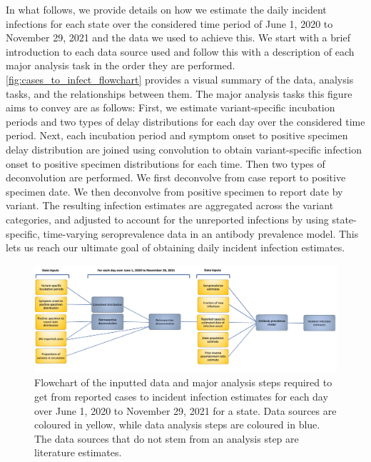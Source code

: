\documentclass{article}
\begin{document}
In what follows, we provide details on how we estimate the daily incident
infections for each state over the considered time period of June 1, 2020 to
November 29, 2021 and the data we used to achieve this. We start with a brief
introduction to each data source used and follow this with a description of each
major analysis task in the order they are performed.
\autoref{fig:cases_to_infect_flowchart} provides a visual summary of the data,
analysis tasks, and the relationships between them. The major analysis tasks this 
figure aims to convey are as follows: 
First, we estimate variant-specific incubation periods and two types of delay distributions
 for each day over the considered time period. Next, each incubation period and symptom
  onset to positive specimen delay distribution are joined using convolution to obtain
   variant-specific infection onset to positive specimen distributions for each time. Then
    two types of deconvolution are performed. We first deconvolve from case report to
     positive specimen date. We then deconvolve from positive specimen to report
      date by variant. The resulting infection estimates are aggregated across the variant
       categories, and adjusted to account for the unreported infections by using state-specific, 
       time-varying seroprevalence data in an antibody prevalence model. This lets us reach our 
       ultimate goal of obtaining daily incident infection estimates.


\begin{figure}[!tb]
\centering
    \includegraphics[width=.99\textwidth]{Reported_cases_to_infect_flowchart.pdf} 
    \caption{Flowchart of the inputted data and major analysis steps required 
    to get from reported cases to incident infection estimates for each day 
    over June 1, 2020 to November 29, 2021 for a state. Data sources are coloured 
    in yellow, while data analysis steps are coloured in blue. The data sources that
    do not stem from an analysis step are literature estimates.}
    \label{fig:cases_to_infect_flowchart}
\end{figure}
\end{document}
